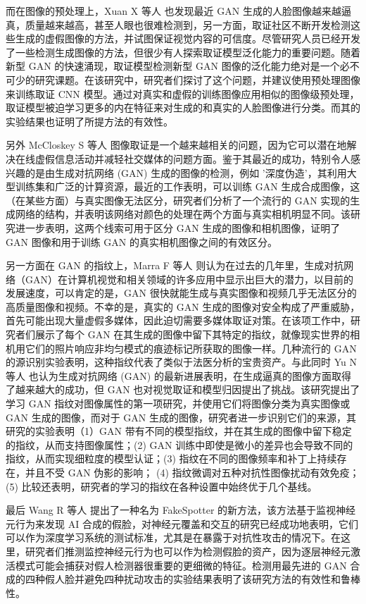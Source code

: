 而在图像的预处理上，Xuan X 等人 \cite{xuan2019generalization} 也发现最近 GAN 生成的人脸图像越来越逼真，质量越来越高，甚至人眼也很难检测到，另一方面，取证社区不断开发检测这些生成的虚假图像的方法，并试图保证视觉内容的可信度。尽管研究人员已经开发了一些检测生成图像的方法，但很少有人探索取证模型泛化能力的重要问题。随着新型 GAN 的快速涌现，取证模型检测新型 GAN 图像的泛化能力绝对是一个必不可少的研究课题。在该研究中，研究者们探讨了这个问题，并建议使用预处理图像来训练取证 CNN 模型。通过对真实和虚假的训练图像应用相似的图像级预处理，取证模型被迫学习更多的内在特征来对生成的和真实的人脸图像进行分类。而其的实验结果也证明了所提方法的有效性。

另外 McCloskey S 等人 \cite{mccloskey2018detecting} 图像取证是一个越来越相关的问题，因为它可以潜在地解决在线虚假信息活动并减轻社交媒体的问题方面。鉴于其最近的成功，特别令人感兴趣的是由生成对抗网络 (GAN) 生成的图像的检测，例如 '深度伪造'，其利用大型训练集和广泛的计算资源，最近的工作表明，可以训练 GAN 生成合成图像，这（在某些方面）与真实图像无法区分，研究者们分析了一个流行的 GAN 实现的生成网络的结构，并表明该网络对颜色的处理在两个方面与真实相机明显不同。该研究进一步表明，这两个线索可用于区分 GAN 生成的图像和相机图像，证明了 GAN 图像和用于训练 GAN 的真实相机图像之间的有效区分。

另一方面在 GAN 的指纹上，Marra F 等人 \cite{marra2019gans} 则认为在过去的几年里，生成对抗网络（GAN）在计算机视觉和相关领域的许多应用中显示出巨大的潜力，以目前的发展速度，可以肯定的是，GAN 很快就能生成与真实图像和视频几乎无法区分的高质量图像和视频。不幸的是，真实的 GAN 生成的图像对安全构成了严重威胁，首先可能出现大量虚假多媒体，因此迫切需要多媒体取证对策。在该项工作中，研究者们展示了每个 GAN 在其生成的图像中留下其特定的指纹，就像现实世界的相机用它们的照片响应非均匀模式的痕迹标记所获取的图像一样。几种流行的 GAN 的源识别实验表明，这种指纹代表了类似于法医分析的宝贵资产。与此同时 Yu N 等人 \cite{yu2019attributing} 也认为生成对抗网络 (GAN) 的最新进展表明，在生成逼真的图像方面取得了越来越大的成功，但 GAN 也对视觉取证和模型归因提出了挑战。该研究提出了学习 GAN 指纹对图像属性的第一项研究，并使用它们将图像分类为真实图像或 GAN 生成的图像，而对于 GAN 生成的图像，研究者进一步识别它们的来源，其研究的实验表明（1）GAN 带有不同的模型指纹，并在其生成的图像中留下稳定的指纹，从而支持图像属性；(2) GAN 训练中即使是微小的差异也会导致不同的指纹，从而实现细粒度的模型认证；(3) 指纹在不同的图像频率和补丁上持续存在，并且不受 GAN 伪影的影响； (4) 指纹微调对五种对抗性图像扰动有效免疫；(5) 比较还表明，研究者的学习的指纹在各种设置中始终优于几个基线。

最后 Wang R 等人 \cite{wang1909fakespotter} 提出了一种名为 FakeSpotter 的新方法，该方法基于监视神经元行为来发现 AI 合成的假脸，对神经元覆盖和交互的研究已经成功地表明，它们可以作为深度学习系统的测试标准，尤其是在暴露于对抗性攻击的情况下。在这里，研究者们推测监控神经元行为也可以作为检测假脸的资产，因为逐层神经元激活模式可能会捕获对假人检测器很重要的更细微的特征。检测用最先进的 GAN 合成的四种假人脸并避免四种扰动攻击的实验结果表明了该研究方法的有效性和鲁棒性。

